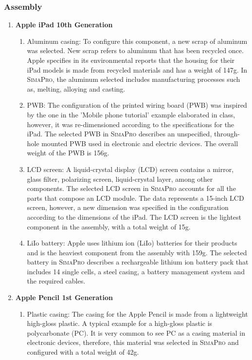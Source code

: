 \subsubsection*{Assembly}
\begin{enumerate}
    \item \textbf{Apple iPad 10th Generation}
    \begin{enumerate}
        \item Aluminum casing: To configure this component, a new scrap of aluminum was selected. New scrap refers to aluminum that has been recycled once. Apple specifies in its environmental reports that the housing for their iPad models is made from recycled materials and has a weight of 147g. In \textsc{SimaPro}, the aluminum selected includes manufacturing processes such as, melting, alloying and casting. 
        \item PWB: The configuration of the printed wiring board (PWB) was inspired by the one in the 'Mobile phone tutorial' example elaborated in class, however, it was re-dimensioned according to the specifications for the iPad. The selected PWB in \textsc{SimaPro} describes an unspecified, through-hole mounted PWB used in electronic and electric devices. The overall weight of the PWB is 156g. 
        \item LCD screen: A liquid-crystal display (LCD) screen contains a mirror, glass filter, polarizing screen, liquid-crystal layer, among other components. The selected LCD screen in \textsc{SimaPro} accounts for all the parts that compose an LCD module. The data represents a 15-inch LCD screen, however, a new dimension was specified in the configuration according to the dimensions of the iPad. The LCD screen is the lightest component in the assembly, with a total weight of 15g. 
        \item LiIo battery: Apple uses lithium ion (LiIo) batteries for their products and is the heaviest component from the assembly with 159g. The selected battery in \textsc{SimaPro} describes a rechargeable lithium ion battery pack that includes 14 single cells, a steel casing, a battery management system and the required cables. 
    \end{enumerate}
    \item \textbf{Apple Pencil 1st Generation}
    \begin{enumerate}
        \item Plastic casing: The casing for the Apple Pencil is made from a lightweight high-gloss plastic. A typical example for a high-gloss plastic is polycarbonate (PC). It is very common to see PC as a casing material in electronic devices, therefore, this material was selected in \textsc{SimaPro} and configured with a total weight of 42g. 

\end{enumerate}
\end{enumerate}
